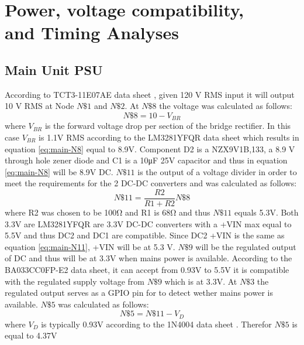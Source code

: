 \section{Power, voltage compatibility,\\ and Timing Analyses}
\subsection{Main Unit PSU}
According to TCT3-11E07AE data sheet \cite{TCT311E07AETriadMagnetics}, given 120 V RMS input it will output 10 V RMS at Node $N\$1$ and $N\$2$. At $N\$8$ the voltage was calculated as follows:
\begin{equation}
  N\$8 = 10 - V_{BR}
  \label{eq:main-N8}
\end{equation}
where $V_{BR}$ is the forward voltage drop per section of the bridge rectifier. In this case $V_{BR}$ is \num{1.1}\si{\V} RMS according to the LM3281YFQR data sheet \cite{LM3281YFQR} which results in equation \ref{eq:main-N8} equal to 8.9\si{\V}. Component D2 is a NZX9V1B,133, a 8.9 V through hole zener diode and C1 is a 10\si{\micro\farad} 25V capacitor and thus in equation \ref{eq:main-N8} will be 8.9\si{\V} DC. $N\$11$ is the output of a voltage divider in order to meet the requirements for the 2 DC-DC converters and was calculated as follows:
\begin{equation}
  N\$11 = \frac{R2}{R1+R2}N\$8
  \label{eq:main-N11}
\end{equation}
where R2 was chosen to be 100\si{\ohm} and R1 is 68\si{\ohm} and thus $N\$11$ equals 5.3\si{\V}. Both 3.3\si{\V} are LM3281YFQR \cite{LM3281YFQR} are 3.3\si{\V} DC-DC converters with a +VIN max equal to 5.5\si{\V} and thus DC2 and DC1 are compatible. Since DC2 +VIN is the same as equation \ref{eq:main-N11}, +VIN will be at 5.3 V. $N\$9$ will be the regulated output of DC and thus will be at 3.3V when mains power is available. According to the BA033CC0FP-E2 data sheet, \cite{BA033CC0FPE2} it can accept from 0.93\si{\V} to 5.5\si{\V} it is compatible with the regulated supply voltage from $N\$9$ which is at 3.3\si{\V}. At $N\$3$ the regulated output serves as a GPIO pin for to detect wether mains power is available. $N\$5$ was calculated as follows:
\begin{equation}
  N\$5 =  N\$11 - V_{D}
  \label{eq:main-N5}
\end{equation}
where $V_{D}$ is typically 0.93\si{\V} according to the 1N4004 data sheet \cite{1N4004RLG}. Therefor $N\$5$ is equal to 4.37\si{\V}
